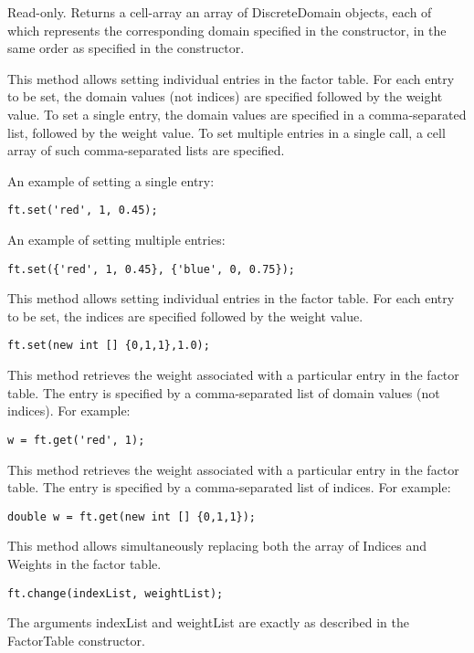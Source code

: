 
Read-only.  Returns \ifmatlab a cell-array \fi \ifjava an array \fi of DiscreteDomain objects, each of which represents the corresponding domain specified in the constructor, in the same order as specified in the constructor.



\label{sec:FactorTable.set}


\ifmatlab

This method allows setting individual entries in the factor table.  For each entry to be set, the domain values (not indices) are specified followed by the weight value.  To set a single entry, the domain values are specified in a comma-separated list, followed by the weight value.  To set multiple entries in a single call, a cell array of such comma-separated lists are specified.

An example of setting a single entry:
\begin{lstlisting}
ft.set('red', 1, 0.45);
\end{lstlisting}

An example of setting multiple entries:
\begin{lstlisting}
ft.set({'red', 1, 0.45}, {'blue', 0, 0.75});
\end{lstlisting}
\fi

\ifjava

This method allows setting individual entries in the factor table.  For each entry to be set, the indices are specified followed by the weight value.  

\begin{lstlisting}
ft.set(new int [] {0,1,1},1.0);
\end{lstlisting}
\fi


\ifmatlab
This method retrieves the weight associated with a particular entry in the factor table.  The entry is specified by a comma-separated list of domain values (not indices).  For example:

\begin{lstlisting}
w = ft.get('red', 1);
\end{lstlisting}
\fi

\ifjava
This method retrieves the weight associated with a particular entry in the factor table.  The entry is specified by a comma-separated list of indices.  For example:

\begin{lstlisting}
double w = ft.get(new int [] {0,1,1});
\end{lstlisting}
\fi


This method allows simultaneously replacing both the array of Indices and Weights in the factor table.

\begin{lstlisting}
ft.change(indexList, weightList);
\end{lstlisting}

The arguments indexList and weightList are exactly as described in the FactorTable constructor.

